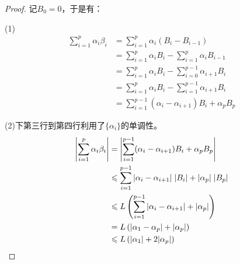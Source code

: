 \begin{proof}
	记$B_0=0$，于是有：\par
	(1)
	\begin{align*}
		\sum_{i=1}^p\alpha_i\beta_i
		&=\sum_{i=1}^p\alpha_i(B_i-B_{i-1}) \\
		&=\sum_{i=1}^p\alpha_iB_i-\sum_{i=1}^p\alpha_iB_{i-1} \\
		&=\sum_{i=1}^p\alpha_iB_i-\sum_{i=0}^{p-1}\alpha_{i+1}B_{i} \\
		&=\sum_{i=1}^p\alpha_iB_i-\sum_{i=1}^{p-1}\alpha_{i+1}B_{i} \\
		&=\sum_{i=1}^{p-1}(\alpha_i-\alpha_{i+1})B_i+\alpha_pB_p
	\end{align*}\par
	(2)下第三行到第四行利用了$\{\alpha_i\}$的单调性。
	\begin{align*}
		\left|\sum_{i=1}^p\alpha_i\beta_i\right|
		&=\left|\sum_{i=1}^{p-1}(\alpha_i-\alpha_{i+1})B_i+\alpha_pB_p\right| \\
		&\leqslant\sum_{i=1}^{p-1}|\alpha_i-\alpha_{i+1}|\;|B_i|+|\alpha_p|\;|B_p| \\
		&\leqslant L\left(\sum_{i=1}^{p-1}|\alpha_i-\alpha_{i+1}|+|\alpha_p|\right) \\
		&=L\left(|\alpha_1-\alpha_p|+|\alpha_p|\right) \\
		&\leqslant L\left(|\alpha_1|+2|\alpha_p|\right)\qedhere
	\end{align*}
\end{proof}

